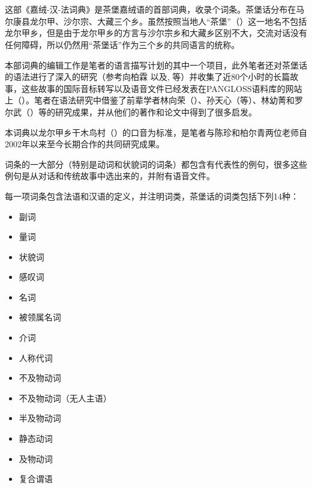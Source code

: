 
\cn
\section*{}

这部《嘉绒-汉-法词典》是茶堡嘉绒语的首部词典，收录个词条。茶堡话分布在马尔康县龙尔甲、沙尔宗、大藏三个乡。虽然按照当地人“茶堡”（）这一地名不包括龙尔甲乡，但是由于龙尔甲乡的方言与沙尔宗乡和大藏乡区别不大，交流对话没有任何障碍，所以仍然用“茶堡话”作为三个乡的共同语言的统称。

本部词典的编辑工作是笔者的语言描写计划的其中一个项目，此外笔者还对茶堡话的语法进行了深入的研究（参考向柏霖 \citeyear{jacques08}以及\citealt{jacques12incorp, jacques13tropative, jacques14antipassive,  jacques15spontaneous}, \citeyear{jacques15causative, jacques16relatives}等）并收集了近80个小时的长篇故事，这些故事的国际音标转写以及语音文件已经发表在PANGLOSS语料库的网站上（\citealt{michailovsky14pangloss}）。笔者在语法研究中借鉴了前辈学者林向荣（\citeyear{linxr93jiarong}）、孙天心（\citeyear{jackson00sidaba, jackson04zhuangmaoci, jackson06paisheng, jackson14morpho}等）、林幼菁和罗尔武（\citeyear{linluo03}）等的研究成果，并从他们的著作和论文中得到了很多启发。


本词典以龙尔甲乡干木鸟村（）的口音为标准，是笔者与陈珍和柏尔青两位老师自2002年以来至今长期合作的共同研究成果。

词条的一大部分（特别是动词和状貌词的词条）都包含有代表性的例句，很多这些例句是从对话和传统故事中选出来的，并附有语音文件。

每一项词条包含法语和汉语的定义，并注明词类，茶堡话的词类包括下列14种：

\begin{itemize}
\item {} 副词
\item {} 量词
\item {} 状貌词
\item {} 感叹词
\item {} 名词
\item {} 被领属名词
\item {} 介词
\item {} 人称代词
\item {} 不及物动词
\item {} 不及物动词（无人主语）
\item {} 半及物动词
\item {} 静态动词
\item {} 及物动词
\item {} 复合谓语
\end{itemize}

